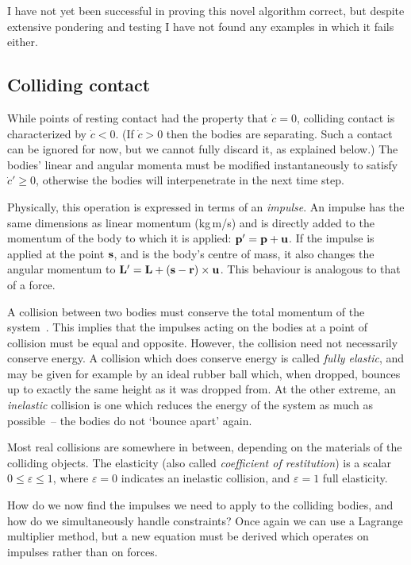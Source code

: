 I have not yet been successful in proving this novel algorithm correct, but despite extensive
pondering and testing I have not found any examples in which it fails either.

\subsection{Colliding contact\label{collidingContact}}

While points of resting contact had the property that $\dot{c} = 0$, colliding contact is
characterized by $\dot{c} < 0$. (If $\dot{c} > 0$ then the bodies are separating.
Such a contact can be ignored for now, but we cannot fully discard it, as explained
below.) The bodies' linear and angular momenta must be modified instantaneously to satisfy
$\dot{c}' \ge 0$, otherwise the bodies will interpenetrate in the next time step.

Physically, this operation is expressed in terms of an \emph{impulse}. An impulse  has the
same dimensions as linear momentum  (kg\,m/s) and is directly added to the momentum of the
body to which it is applied: $\ve{p}' = \ve{p} + \ve{u}$. If the impulse is applied at the point
$\ve{s}$, and  is the body's centre of mass, it also changes the angular momentum to
$\ve{L}' = \ve{L} + (\ve{s} - \ve{r})\times\ve{u}$. This behaviour is analogous to that of a
force.

A collision between two bodies must conserve the total momentum of the system~\cite{Feynman:63}.
This implies that the impulses acting on the bodies at a point of collision must be equal and
opposite. However, the collision need not necessarily conserve energy. A collision which does
conserve energy is called \emph{fully elastic}, and may be given for example
by an ideal rubber ball which, when dropped, bounces up to exactly the same height as it was
dropped from. At the other extreme, an \emph{inelastic} collision is one which reduces the energy
of the system as much as possible~-- the bodies do not `bounce apart' again.

Most real collisions are somewhere in between, depending on the materials of the colliding
objects. The elasticity (also called \emph{coefficient of restitution}) is a scalar
$0 \le \varepsilon \le 1$, where $\varepsilon = 0$ indicates an inelastic collision, and
$\varepsilon = 1$ full elasticity.

How do we now find the impulses we need to apply to the colliding bodies, and how do we
simultaneously handle constraints? Once again we can use a Lagrange multiplier method, but a new
equation must be derived which operates on impulses rather than on forces.

